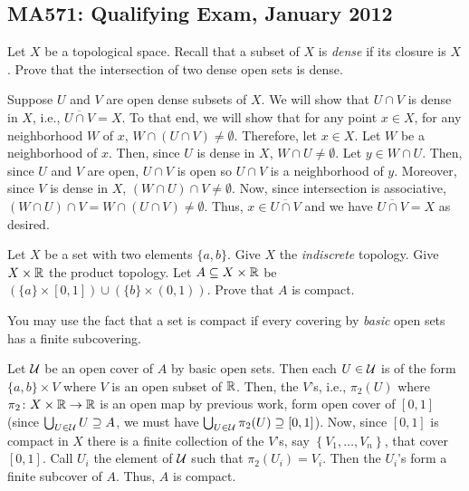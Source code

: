 \subsection{MA571: Qualifying Exam, January 2012}
\setcounter{exercise}{0}

\begin{problem}
Let $X$ be a topological space. Recall that a subset of $X$ is \emph{dense}
if its closure is $X$. Prove that the intersection of two dense open sets is
dense.
\end{problem}
\begin{solution}
Suppose $U$ and $V$ are open dense subsets of $X$. We will show that $U\cap
V$ is dense in $X$, i.e., $\overline{U\cap V}=X$. To that end, we will show
that for any point $x\in X$, for any neighborhood $W$ of $x$, $W\cap(U\cap
V)\neq\emptyset$. Therefore, let $x\in X$. Let $W$ be a neighborhood of
$x$. Then, since $U$ is dense in $X$, $W\cap U\neq\emptyset$. Let $y\in
W\cap U$. Then, since $U$ and $V$ are open, $U\cap V$ is open so $U\cap V$
is a neighborhood of $y$. Moreover, since $V$ is dense in $X$, $(W\cap
U)\cap V\neq\emptyset$. Now, since intersection is associative, $(W\cap
U)\cap V=W\cap(U\cap V)\neq\emptyset$. Thus, $x\in\overline{U\cap V}$ and
we have $\overline{U\cap V}=X$ as desired.
\end{solution}

\begin{problem}
Let $X$ be a set with two elements $\{a,b\}$. Give $X$ the
\emph{indiscrete} topology. Give $X\times\mathbb{R}$ the product topology. Let
$A\subseteq X\times\mathbb{R}$ be $(\{a\}\times[0,1])\cup(\{b\}\times(0,1))$. Prove
that $A$ is compact.

You may use the fact that a set is compact if every covering by
\emph{basic} open sets has a finite subcovering.
\end{problem}
\begin{solution}
Let $\mathcal{U}$ be an open cover of $A$ by basic open sets. Then each
$U\in\mathcal{U}$ is of the form $\{a,b\}\times V$ where $V$ is an open subset of
$\mathbb{R}$. Then, the $V$'s, i.e., $\pi_2(U)$ where $\pi_2\colon
X\times\mathbb{R}\to\mathbb{R}$ is an open map by previous work, form open cover of
$[0,1]$ (since $\bigcup_{U\in\mathcal{U}} U\supseteq A$, we must have
$\bigcup_{U\in\mathcal{U}}\pi_2(U)\supseteq[0,1]$). Now, since $[0,1]$ is compact
in $X$ there is a finite collection of the $V$'s, say
$\left\{V_1,\dotsc,V_n\right\}$, that cover $[0,1]$. Call $U_i$ the element of
$\mathcal{U}$ such that $\pi_2(U_i)=V_i$. Then the $U_i$'s form a finite subcover
of $A$. Thus, $A$ is compact.
\end{solution}

